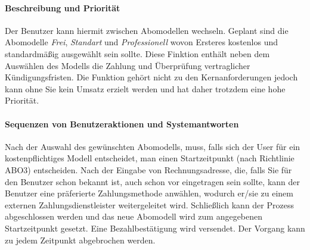 \paragraph{Beschreibung und Priorität}
Der Benutzer kann hiermit zwischen Abomodellen wechseln. Geplant sind die Abomodelle \textit{Frei}, \textit{Standart} und \textit{Professionell} wovon Ersteres kostenlos und standardmäßig ausgewählt sein sollte. Diese Finktion enthält neben dem Auswählen des Modells die Zahlung und Überprüfung vertraglicher Kündigungsfristen. Die Funktion gehört nicht zu den Kernanforderungen jedoch kann ohne Sie kein Umsatz erzielt werden und hat daher trotzdem eine hohe Priorität.


\paragraph{Sequenzen von Benutzeraktionen und Systemantworten}
Nach der Auswahl des gewünschten Abomodells, muss, falls sich der User für ein kostenpflichtiges Modell entscheidet, man einen Startzeitpunkt (nach Richtlinie ABO3) entscheiden. Nach der Eingabe von Rechnungsadresse, die, falls Sie für den Benutzer schon bekannt ist, auch schon vor eingetragen sein sollte, kann der Benutzer eine präferierte Zahlungsmethode anwählen, wodurch er/sie zu einem externen Zahlungsdienstleister weitergeleitet wird. Schließlich kann der Prozess abgeschlossen werden und das neue Abomodell wird zum angegebenen Startzeitpunkt gesetzt. Eine Bezahlbestätigung wird versendet. Der Vorgang kann zu jedem Zeitpunkt abgebrochen werden.

